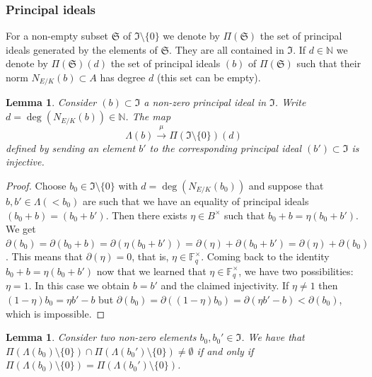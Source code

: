 \documentclass[11pt]{amsart}
\numberwithin{equation}{section}
\newcommand{\FF}{\mathbb{F}}
\newcommand{\NN}{\mathbb{N}}
\newtheorem{Lemma}[Theorem]{Lemma}
\begin{document}
\subsubsection*{Principal ideals}
For a non-empty subset $\mathfrak{S}$ of $\mathfrak{I}\setminus\{0\}$ we denote by $\Pi(\mathfrak{S})$ the set of principal ideals 
generated by the elements of $\mathfrak{S}$. They are all contained in $\mathfrak{I}$. If $d\in\NN$ we denote by $\Pi(\mathfrak{S})(d)$ the set of principal ideals $(b)$ of $\Pi(\mathfrak{S})$ such that their norm $N_{E/K}(b)\subset A$ has degree $d$ (this set can be empty).

\begin{Lemma}\label{lemma-goss-1}
Consider $(b)\subset\mathfrak{I}$ a non-zero principal ideal in $\mathfrak{I}$. Write $d=\deg(N_{E/K}(b))\in\NN$.
The map 
$$\Lambda(b)\xrightarrow{\mu}\Pi(\mathfrak{I}\setminus\{0\})(d)$$
defined by sending an element $b'$ to the corresponding principal ideal $(b')\subset\mathfrak{I}$ is injective.
\end{Lemma}

\begin{proof}
Choose $b_0\in\mathfrak{I}\setminus\{0\}$ with $d=\deg(N_{E/K}(b_0))$
and suppose that $b,b'\in\Lambda(<b_0)$ are such that we have an equality of principal ideals $(b_0+b)=(b_0+b')$. Then there exists $\eta\in B^\times$ such that $b_0+b=\eta(b_0+b')$. We get $\partial(b_0)=\partial(b_0+b)=\partial(\eta(b_0+b'))=\partial(\eta)+\partial(b_0+b')=
\partial(\eta)+\partial(b_0)$. This means that $\partial(\eta)=0$, that is, $\eta\in\FF_q^\times$. Coming back to the identity
$b_0+b=\eta(b_0+b')$ now that we learned that $\eta\in\FF_q^\times$, we have two possibilities: $\eta=1$. In this case we obtain $b=b'$ and the claimed injectivity. If $\eta\neq1$ then $(1-\eta)b_0=\eta b'-b$ but $\partial(b_0)=\partial((1-\eta)b_0)=\partial(\eta b'-b)<\partial(b_0)$, which is impossible. 
\end{proof}

\begin{Lemma}\label{lemma-goss-2}
Consider two non-zero elements $b_0,b_0'\in\mathfrak{I}$. We have that $\Pi(\Lambda(b_0)\setminus\{0\})\cap\Pi(\Lambda(b_0')\setminus\{0\})\neq\emptyset$ if and only if
$\Pi(\Lambda(b_0)\setminus\{0\})=\Pi(\Lambda(b_0')\setminus\{0\})$.
\end{Lemma}
\end{document}
